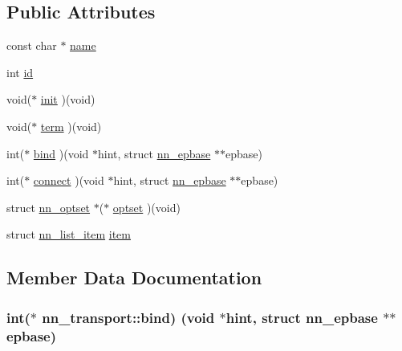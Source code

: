 \subsection*{Public Attributes}
\begin{DoxyCompactItemize}
\item 
const char $\ast$ \hyperlink{structnn__transport_a41c2bd6de70330d2dc35887143428de7}{name}
\item 
int \hyperlink{structnn__transport_afa0ae53caa7dc89cb290f7a36ea2bcf1}{id}
\item 
void($\ast$ \hyperlink{structnn__transport_ae93a54f87dd8d25c83364a6daec3cb8c}{init} )(void)
\item 
void($\ast$ \hyperlink{structnn__transport_a3a61c62241f41d01ad4d0c165462b8b5}{term} )(void)
\item 
int($\ast$ \hyperlink{structnn__transport_a252ff42ea9c5706048fff715828d5f60}{bind} )(void $\ast$hint, struct \hyperlink{structnn__epbase}{nn\+\_\+epbase} $\ast$$\ast$epbase)
\item 
int($\ast$ \hyperlink{structnn__transport_a8b9815786bf58364e89921bec636a1f9}{connect} )(void $\ast$hint, struct \hyperlink{structnn__epbase}{nn\+\_\+epbase} $\ast$$\ast$epbase)
\item 
struct \hyperlink{structnn__optset}{nn\+\_\+optset} $\ast$($\ast$ \hyperlink{structnn__transport_a44552f61e9236e7987e3c921361c76a8}{optset} )(void)
\item 
struct \hyperlink{structnn__list__item}{nn\+\_\+list\+\_\+item} \hyperlink{structnn__transport_ac8ae899e71a699a7bb1bb506aa404437}{item}
\end{DoxyCompactItemize}


\subsection{Member Data Documentation}
\subsubsection[{bind}]{\setlength{\rightskip}{0pt plus 5cm}int($\ast$ nn\+\_\+transport\+::bind) (void $\ast$hint, struct {\bf nn\+\_\+epbase} $\ast$$\ast$epbase)}\hypertarget{structnn__transport_a252ff42ea9c5706048fff715828d5f60}{}\label{structnn__transport_a252ff42ea9c5706048fff715828d5f60}
